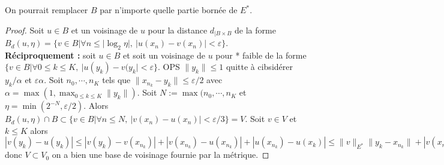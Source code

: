 \begin{remarque}
    On pourrait remplacer $B$ par n'importe quelle partie bornée de $E^*$.
\end{remarque}

\begin{proof}
    Soit $u\in B$ et un voisinage de $u$ pour la distance $d_{|B\times B}$ de la forme $B_d(u, \eta)=\{v\in B| \forall n\le |\log_2\eta|,\ |u(x_{n})-v(x_{n})|<\varepsilon\} $.\\
    \textbf{Réciproquement :} soit $u\in B$ et soit un voisinage de $u$ pour * faible de la forme $\{v\in B|\forall 0\le k\le K,\ |u(y_{k})-v(y_{k}|<\varepsilon  \} $. OPS $\|y_k\|\le 1$ quitte à cibsidérer $y_k/\alpha $ et $\varepsilon \alpha $. Soit $n_0, \cdots, n_K$ tels que $\|x_{n_k}-y_k \|\le \varepsilon /2$ avec $\alpha =\max(1, \max_{0\le k\le K}\|y_k\|)$. Soit $N:=\max(n_0,\cdots,n_K$ et $\eta=\min(2^{-N},\varepsilon /2)$. Alors $B_d(u, \eta)\cap B\subset \{v\in B| \forall n\le N,\ |v(x_{n})-u(x_{n})|<\varepsilon /3 \} =V$. Soit $v\in V$ et $k\le K$ alors $|v(y_k)-u(y_k)|\le |v(y_k)-v(x_{n_k})|+|v(x_{n_k})-u(x_{n_k})|+|u(x_{n_k})-u(x_k)|\le \|v\|_{E^*}\|y_k-x_{n_k}\|+|v(x_{n_k})-u(x_{n_k})|+\|u\|_{E^*}\|y_k-x_{n_k}\|\le 1*\varepsilon /3+\varepsilon /3 +1*\varepsilon /3<\varepsilon $ donc $V\subset V_0$ on a bien une base de voisinage fournie par la métrique.
\end{proof}
